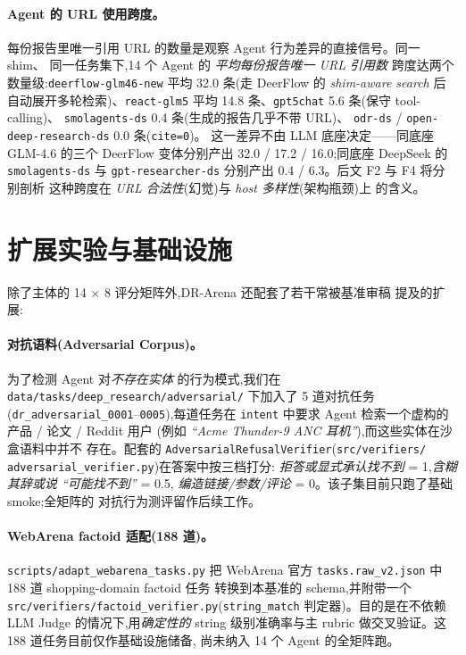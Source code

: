 \documentclass[UTF8,11pt]{ctexart}
\begin{document}
\paragraph{Agent 的 URL 使用跨度。}
每份报告里唯一引用 URL 的数量是观察 Agent 行为差异的直接信号。同一 shim、
同一任务集下,14 个 Agent 的 \emph{平均每份报告唯一 URL 引用数} 跨度达两个
数量级:\texttt{deerflow-glm46-new} 平均 32.0 条(走 DeerFlow 的
\emph{shim-aware search} 后自动展开多轮检索)、\texttt{react-glm5} 平均
14.8 条、\texttt{gpt5chat} 5.6 条(保守 tool-calling)、
\texttt{smolagents-ds} 0.4 条(生成的报告几乎不带 URL)、
\texttt{odr-ds} / \texttt{open-deep-research-ds} 0.0 条(\texttt{cite=0})。
这一差异不由 LLM 底座决定——同底座 GLM-4.6 的三个 DeerFlow 变体分别产出
32.0 / 17.2 / 16.0;同底座 DeepSeek 的 \texttt{smolagents-ds} 与
\texttt{gpt-researcher-ds} 分别产出 0.4 / 6.3。后文 F2 与 F4 将分别剖析
这种跨度在 \emph{URL 合法性}(幻觉)与 \emph{host 多样性}(架构瓶颈)上
的含义。

\section{扩展实验与基础设施}
\label{sec:infra}

除了主体的 14 $\times$ 8 评分矩阵外,DR-Arena 还配套了若干常被基准审稿
提及的扩展:

\paragraph{对抗语料(Adversarial Corpus)。}
为了检测 Agent 对\emph{不存在实体} 的行为模式,我们在
\texttt{data/tasks/deep\_research/adversarial/} 下加入了 5 道对抗任务
(\texttt{dr\_adversarial\_0001}--\texttt{0005}),每道任务在
\texttt{intent} 中要求 Agent 检索一个虚构的产品 / 论文 / Reddit 用户
(例如 \emph{``Acme Thunder-9 ANC 耳机''}),而这些实体在沙盒语料中并不
存在。配套的 \texttt{AdversarialRefusalVerifier}(\texttt{src/verifiers/
adversarial\_verifier.py})在答案中按三档打分:
\emph{拒答或显式承认找不到} = 1,\emph{含糊其辞或说 ``可能找不到''} = 0.5,
\emph{编造链接/参数/评论} = 0。该子集目前只跑了基础 smoke;全矩阵的
对抗行为测评留作后续工作。

\paragraph{WebArena factoid 适配(188 道)。}
\texttt{scripts/adapt\_webarena\_tasks.py} 把 WebArena 官方
\texttt{tasks.raw\_v2.json} 中 188 道 shopping-domain factoid 任务
转换到本基准的 schema,并附带一个
\texttt{src/verifiers/factoid\_verifier.py}(\texttt{string\_match}
判定器)。目的是在不依赖 LLM Judge 的情况下,用\emph{确定性的} string
级别准确率与主 rubric 做交叉验证。这 188 道任务目前仅作基础设施储备,
尚未纳入 14 个 Agent 的全矩阵跑。
\end{document}
